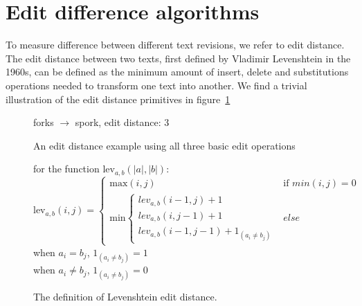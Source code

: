 \section{Edit difference algorithms}
To measure difference between different text revisions, we refer to
edit distance. The edit distance between two texts, first defined by
Vladimir Levenshtein in the 1960s,\cite{Levenshtein1966} can be
defined as the minimum amount of insert, delete and substitutions
operations needed to transform one text into another. We find a
trivial illustration of the edit distance primitives in
figure~\ref{fig:fork-spork}

\begin{figure}
  \centering
  

  \vspace{3 mm}

  forks $\rightarrow$ spork, edit distance: 3
  
  \caption{An edit distance example using all three basic edit
    operations}
  \label{fig:fork-spork}
\end{figure}

\begin{figure}
  \vspace{5mm}
  \centering
  for the function $\mbox{lev}_{a,b}(|a|,|b|)$:\\
  $$\mbox{lev}_{a,b}(i,j) = 
  \left\{
  \begin{array}{ll}
    \mbox{max}(i,j) & \mbox{if }min(i,j) = 0\\
    \mbox{min}\left\{
    \begin{array}{lll}
      lev_{a,b}(i-1,j)+1\\
      lev_{a,b}(i,j-1)+1\\
      lev_{a,b}(i-1,j-1)+1_{(a_i{\neq}b_j)}
    \end{array}
    \right.
    & else 
  \end{array}
  \right.$$
  when $a_i = b_j$, $1_{(a_i{\neq}b_j)} = 1$\\
  when  $a_i \neq b_j$, $1_{(a_i{\neq}b_j)} = 0$
  \caption{The definition of Levenshtein edit distance.}
  \label{fig:levdef}
\end{figure}

